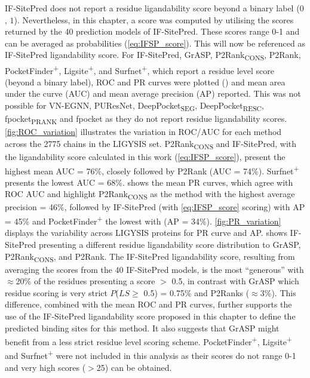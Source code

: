 IF-SitePred does not report a residue ligandability score beyond a binary label ($0$, $1$). Nevertheless, in this chapter, a score was computed by utilising the scores returned by the 40 prediction models of IF-SitePred. These scores range 0-1 and can be averaged as probabilities (\autoref{eq:IFSP_score}). This will now be referenced as IF-SitePred ligandability score. For IF-SitePred, GrASP, P2Rank\textsubscript{CONS}, P2Rank, PocketFinder\textsuperscript{+}, Ligsite\textsuperscript{+}, and Surfnet\textsuperscript{+}, which report a residue level score (beyond a binary label), ROC and PR curves were plotted () and mean area under the curve (AUC) and mean average precision (AP) reported. This was not possible for VN-EGNN, PUResNet, DeepPocket\textsubscript{SEG}, DeepPocket\textsubscript{RESC}, fpocket\textsubscript{PRANK} and fpocket as they do not report residue ligandability scores. \autoref{fig:ROC_variation} illustrates the variation in ROC/AUC for each method across the 2775 chains in the LIGYSIS set. P2Rank\textsubscript{CONS} and IF-SitePred, with the ligandability score calculated in this work (\autoref{eq:IFSP_score}), present the highest mean AUC = 76\%, closely followed by P2Rank (AUC = 74\%). Surfnet\textsuperscript{+} presents the lowest AUC = 68\%.  shows the mean PR curves, which agree with ROC AUC and highlight P2Rank\textsubscript{CONS} as the method with the highest average precision = 46\%, followed by IF-SitePred (with \autoref{eq:IFSP_score} scoring) with AP = 45\% and PocketFinder\textsuperscript{+} the lowest with (AP = 34\%). \autoref{fig:PR_variation} displays the variability across LIGYSIS proteins for PR curve and AP.  shows IF-SitePred presenting a different residue ligandability score distribution to GrASP, P2Rank\textsubscript{CONS}, and P2Rank. The IF-SitePred ligandability score, resulting from averaging the scores from the 40 IF-SitePred models, is the most ``generous'' with $\approx$20\% of the residues presenting a score $>$ 0.5, in contrast with GrASP which residue scoring is very strict $P$($LS \geq$ 0.5) = 0.75\% and P2Ranks ($\approx$3\%). This difference, combined with the mean ROC and PR curves, further supports the use of the IF-SitePred ligandability score proposed in this chapter to define the predicted binding sites for this method. It also suggests that GrASP might benefit from a less strict residue level scoring scheme. PocketFinder\textsuperscript{+}, Ligsite\textsuperscript{+} and Surfnet\textsuperscript{+} were not included in this analysis as their scores do not range 0-1 and very high scores ($>$25) can be obtained.

